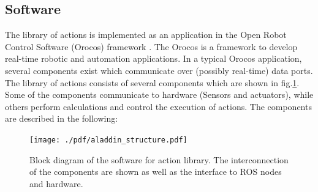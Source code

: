 \subsection{Software}
\label{sec:software}
The library of actions is implemented as an application in the Open Robot Control Software (Orocos) framework \cite{rtt-url,soetens2006}.
The Orocos is a framework to develop real-time robotic and automation applications.
In a typical Orocos application, several components exist which communicate over (possibly real-time) data ports.
The library of actions consists of several components which are shown in fig.\ref{fig:aladdin_structure}.
Some of the components communicate to hardware (Sensors and actuators), while others perform calculations and control the execution of actions.
The components are described in the following:
\begin{figure}
      \centering
      \texttt{[image: ./pdf/aladdin\_structure.pdf]}
      \caption{ Block diagram of the software for action library.
      The interconnection of the components are shown as well as the interface to ROS nodes and hardware.
}
      \label{fig:aladdin_structure}
\end{figure}



